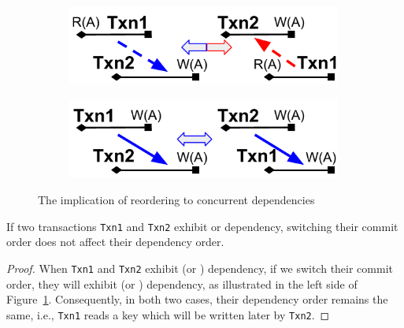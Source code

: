 \begin{figure}[tp]
      \centering
      \begin{subfigure}{0.46\textwidth}
        \includegraphics[width=0.99\textwidth]{diagram/txn/theory_order_rw.pdf}
      \end{subfigure}      
      \begin{subfigure}{0.46\textwidth}
        \includegraphics[width=0.99\textwidth]{diagram/txn/theory_order_ww.pdf}
      \end{subfigure}
      \caption{The implication of reordering to concurrent dependencies}
      \label{diagram:txn:theory_reorder}
\end{figure}

\begin{lemma} 
  \label{lemma:reorder_rw}
  If two transactions \texttt{Txn1} and \texttt{Txn2} exhibit  or
   dependency, switching their commit order does not affect
  their dependency order.
\end{lemma}

\begin{proof}
  When \texttt{Txn1} and \texttt{Txn2} exhibit  (or
  ) dependency, if we switch their commit order, they will
  exhibit  (or ) dependency, as illustrated in the left side of Figure~\ref{diagram:txn:theory_reorder}.
  Consequently, in both two cases, their dependency order remains the same,
  i.e., \texttt{Txn1} reads a key which will be written later by \texttt{Txn2}.
\end{proof}

